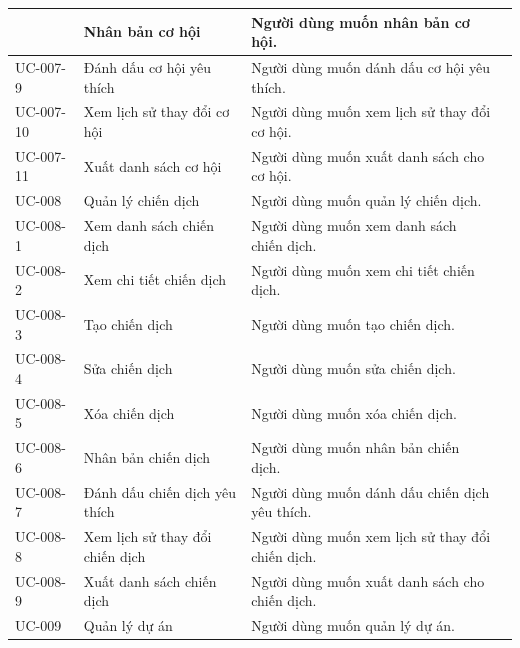 \documentclass[12pt,a4paper]{article}
\begin{document}
\begin{center}
\begin{longtable}{|p{2.5cm}|p{4.5cm}|p{7.5cm}|c|}
            & Nhân bản cơ hội
            & Người dùng muốn nhân bản cơ hội.
            \\ \hline
            UC-007-9
            & Đánh dấu cơ hội yêu thích
            & Người dùng muốn dánh dấu cơ hội yêu thích.
            \\ \hline
            UC-007-10
            & Xem lịch sử thay đổi cơ hội
            & Người dùng muốn xem lịch sử thay đổi cơ hội.
            \\ \hline
            UC-007-11
            & Xuất danh sách cơ hội
            & Người dùng muốn xuất danh sách cho cơ hội.
            \\ \hline
            UC-008
            & Quản lý chiến dịch
            & Người dùng muốn quản lý chiến dịch.
            \\ \hline
            UC-008-1
            & Xem danh sách chiến dịch
            & Người dùng muốn xem danh sách chiến dịch.
            \\ \hline
            UC-008-2
            & Xem chi tiết chiến dịch
            & Người dùng muốn xem chi tiết chiến dịch.
            \\ \hline
            UC-008-3
            & Tạo chiến dịch
            & Người dùng muốn tạo chiến dịch.
            \\ \hline
            UC-008-4
            & Sửa chiến dịch
            & Người dùng muốn sửa chiến dịch.
            \\ \hline
            UC-008-5
            & Xóa chiến dịch
            & Người dùng muốn xóa chiến dịch.
            \\ \hline
            UC-008-6
            & Nhân bản chiến dịch
            & Người dùng muốn nhân bản chiến dịch.
            \\ \hline
            UC-008-7
            & Đánh dấu chiến dịch yêu thích
            & Người dùng muốn dánh dấu chiến dịch yêu thích.
            \\ \hline
            UC-008-8
            & Xem lịch sử thay đổi chiến dịch
            & Người dùng muốn xem lịch sử thay đổi chiến dịch.
            \\ \hline
            UC-008-9
            & Xuất danh sách chiến dịch
            & Người dùng muốn xuất danh sách cho chiến dịch.
            \\ \hline
            UC-009
            & Quản lý dự án
            & Người dùng muốn quản lý dự án.
            \\ \hline

\end{longtable}
\end{center}
\end{document}
